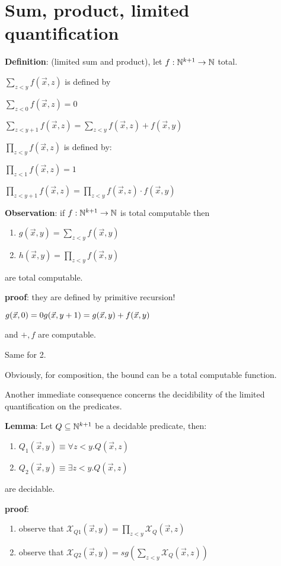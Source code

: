 \section{Sum, product, limited quantification}

\textbf{Definition}: (limited sum and product), let $f:\mathbb{N}^{k+1}\rightarrow\mathbb{N}$ total.

$\sum_{z<y}f(\vec{x},z)$ is defined by

$\sum_{z<0}f(\vec{x},z) = 0$

$\sum_{z<y+1}f(\vec{x},z) = \sum_{z<y}f(\vec{x},z) + f(\vec{x},y)$

$\prod_{z<y}f(\vec{x},z)$ is defined by:

$\prod_{z<1}f(\vec{x},z) = 1$

$\prod_{z<y+1}f(\vec{x},z) = \prod_{z<y}f(\vec{x},z) \cdot f(\vec{x},y)$

\textbf{Observation}: if $f:\mathbb{N}^{k+1}\rightarrow\mathbb{N}$ is total computable then
\begin{enumerate}
\item $g(\vec{x},y) = \sum_{z<y}f(\vec{x},y)$
\item $h(\vec{x},y) = \prod_{z<y}f(\vec{x},y)$
\end{enumerate}
are total computable.

\textbf{proof}: they are defined by primitive recursion!

$g(\vec{x},0) = 0\\
g(\vec{x},y+1) = g(\vec{x},y) + f(\vec{x},y)$

and $+,f$ are computable.

Same for 2.

Obviously, for composition, the bound can be a total computable function.

Another immediate consequence concerns the decidibility of the limited quantification on the predicates.

\textbf{Lemma}: Let $Q\subseteq \mathbb{N}^{k+1}$ be a decidable predicate, then:

\begin{enumerate}
\item $Q_1(\vec{x},y) \equiv \forall z<y. Q(\vec{x},z)$
\item $Q_2(\vec{x},y) \equiv \exists z<y. Q(\vec{x},z)$
\end{enumerate}

are decidable.

\textbf{proof}:
\begin{enumerate}
\item observe that $\mathcal{X}_{Q1}(\vec{x},y) = \prod_{z<y}\mathcal{X}_Q(\vec{x},z)$
\item observe that $\mathcal{X}_{Q2}(\vec{x},y) = sg(\sum_{z<y}\mathcal{X}_Q(\vec{x},z))$
\end{enumerate}

